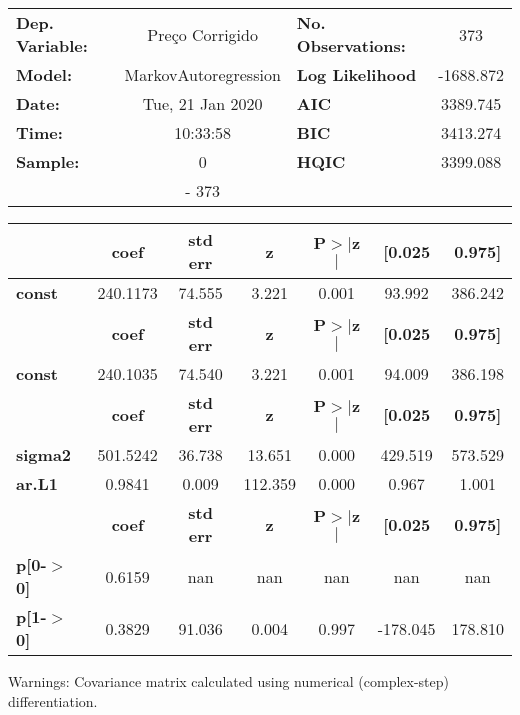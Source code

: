 \begin{center}
\begin{tabular}{lclc}
\toprule
\textbf{Dep. Variable:} &   Preço Corrigido    & \textbf{  No. Observations:  } &    373      \\
\textbf{Model:}         & MarkovAutoregression & \textbf{  Log Likelihood     } & -1688.872   \\
\textbf{Date:}          &   Tue, 21 Jan 2020   & \textbf{  AIC                } &  3389.745   \\
\textbf{Time:}          &       10:33:58       & \textbf{  BIC                } &  3413.274   \\
\textbf{Sample:}        &          0           & \textbf{  HQIC               } &  3399.088   \\
\textbf{}               &         - 373        & \textbf{                     } &             \\
\bottomrule
\end{tabular}
\begin{tabular}{lcccccc}
               & \textbf{coef} & \textbf{std err} & \textbf{z} & \textbf{P$>$$|$z$|$} & \textbf{[0.025} & \textbf{0.975]}  \\
\midrule
\textbf{const} &     240.1173  &       74.555     &     3.221  &         0.001        &       93.992    &      386.242     \\
               & \textbf{coef} & \textbf{std err} & \textbf{z} & \textbf{P$>$$|$z$|$} & \textbf{[0.025} & \textbf{0.975]}  \\
\midrule
\textbf{const} &     240.1035  &       74.540     &     3.221  &         0.001        &       94.009    &      386.198     \\
                & \textbf{coef} & \textbf{std err} & \textbf{z} & \textbf{P$>$$|$z$|$} & \textbf{[0.025} & \textbf{0.975]}  \\
\midrule
\textbf{sigma2} &     501.5242  &       36.738     &    13.651  &         0.000        &      429.519    &      573.529     \\
\textbf{ar.L1}  &       0.9841  &        0.009     &   112.359  &         0.000        &        0.967    &        1.001     \\
                   & \textbf{coef} & \textbf{std err} & \textbf{z} & \textbf{P$>$$|$z$|$} & \textbf{[0.025} & \textbf{0.975]}  \\
\midrule
\textbf{p[0-$>$0]} &       0.6159  &          nan     &       nan  &           nan        &          nan    &          nan     \\
\textbf{p[1-$>$0]} &       0.3829  &       91.036     &     0.004  &         0.997        &     -178.045    &      178.810     \\
\bottomrule
\end{tabular}
\end{center}

Warnings: \newline
 [1] Covariance matrix calculated using numerical (complex-step) differentiation.